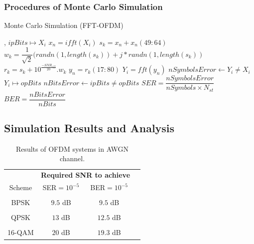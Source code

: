 			\subsubsection{Procedures of Monte Carlo Simulation}  \label{sub4:monte}
			\begin{algorithm} []
			\caption{Monte Carlo Simulation (FFT-OFDM) }
			\label{proce1:FFT}
			\begin{algorithmic}
			   ,
			    \State $ ipBits \mapsto X_i $
				\State $ x_n=ifft(X_i) $
				\State $ s_k= x_n+x_n(49:64) $
				\State $ w_k=\dfrac{1}{\sqrt{2}}(randn(1,length(s_k))+j*randn(1,length(s_k)) $
				\State $ r_k=s_k+10^{\frac{-SNR_{eff}}{20}} . w_k$
				\State $ y_n=r_k(17:80)$
			    \State $ Y_i=fft(y_n) $
				\State $ nSymbolsError\gets Y_i \neq X_i  $
				\State $Y_i\mapsto opBits$
				\State $ nBitsError\gets ipBits \neq opBits   $
			    \EndFor 
			  \State $ SER=\dfrac{nSymbolsError}{nSymbols \times N_{st}} $
   			  \State $ BER=\dfrac{nBitsError}{nBits} $
			  \EndProcedure
			\end{algorithmic}
			\end{algorithm}
		\subsection{Simulation Results and Analysis}
			\begin{table}[h]
			\centering
			\caption{Results of OFDM systems in AWGN channel.}
			\label{tab4:Awgn}
			\begin{tabular}{@{}*3c@{}p{1cm}}
			\toprule[1.5pt]
			&\multicolumn{2}{c}{\textbf{Required SNR to achieve}} \\
			Scheme & SER$ =10^{-5} $ &  BER$ =10^{-5} $ \\
			\cmidrule(lr){1-1} \cmidrule(lr){2-3} \\
			
			BPSK & $ 9.5 $ dB & $ 9.5 $  dB\\
						\\
			QPSK & $ 13 $ dB  &  $ 12.5 $ dB \\
						\\
			16-QAM &  $ 20 $ dB & $ 19.3 $ dB  \\
			\toprule[1.5pt]
			\end{tabular}
			\end{table}


